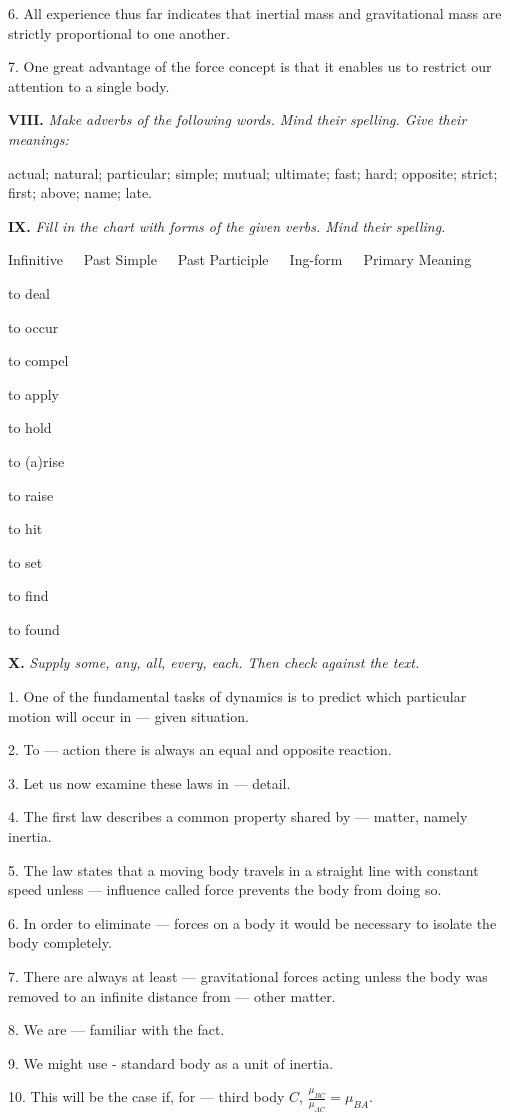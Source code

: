 \documentclass[a4paper]{article}
\newcommand{\ETask}[2]{\medskip\par\textbf{#1.} \textit{#2}\par}
\newcommand{\ETypeWr}[1]{\par\begin{ttfamily}#1\end{ttfamily}\par}
\begin{document}
6. All experience thus far indicates that inertial mass and gravitational mass are strictly proportional to one another.

7. One great advantage of the force concept is that it enables us to restrict our attention to a single body.

\ETask{VIII}{Make adverbs of the following words. Mind their spelling. Give their meanings:}
actual; natural; particular; simple; mutual; ultimate; fast; hard; opposite; strict; first; above; name; late.

\ETask{IX}{Fill in the chart with forms of the given verbs. Mind their spelling.}
\ETypeWr{
Infinitive~~~Past Simple~~~Past Participle~~~Ing-form~~~Primary Meaning

to deal

to occur

to compel

to apply

to hold

to (a)rise

to raise

to hit

to set

to find

to found
}

\ETask{X}{Supply some, any, all, every, each. Then check against the text.}
1. One of the fundamental tasks of dynamics is to predict which particular motion will occur in --- given situation.

2. To --- action there is always an equal and opposite reaction.

3. Let us now examine these laws in --- detail.

4. The first law describes a common property shared by --- matter, namely inertia.

5. The law states that a moving body travels in a straight line with constant speed unless --- influence called force
prevents the body from doing so.

6. In order to eliminate --- forces on a body it would be necessary to isolate the body completely.

7. There are always at least --- gravitational forces acting unless the body was removed to an infinite distance from
--- other matter.

8. We are --- familiar with the fact.

9. We might use - standard body as a unit of inertia.

10. This will be the case if, for --- third body $C$, $\frac{\mu_{BC}}{\mu_{AC}}=\mu_{BA}$.
\end{document}
